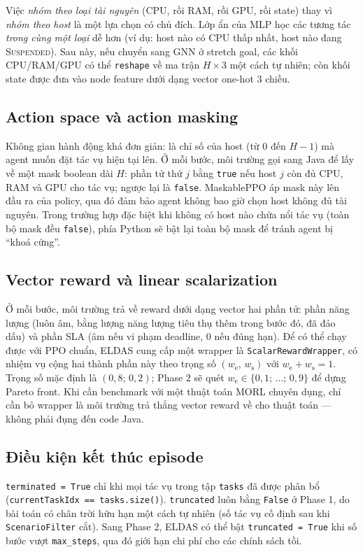 Việc \emph{nhóm theo loại tài nguyên} (CPU, rồi RAM, rồi GPU, rồi
state) thay vì \emph{nhóm theo host} là một lựa chọn có chủ đích.
Lớp ẩn của MLP học các tương tác \emph{trong cùng một loại} dễ hơn
(ví dụ: host nào có CPU thấp nhất, host nào đang \textsc{Suspended}).
Sau này, nếu chuyển sang GNN ở stretch goal, các khối CPU/RAM/GPU có
thể \texttt{reshape} về ma trận $H \times 3$ một cách tự nhiên; còn
khối state được đưa vào node feature dưới dạng vector one-hot $3$
chiều.

\subsection{Action space và action masking}
\label{ssec:action-space}
Không gian hành động khá đơn giản: là chỉ số của host (từ $0$ đến
$H - 1$) mà agent muốn đặt tác vụ hiện tại lên. Ở mỗi bước, môi
trường gọi sang Java để lấy về một mask boolean dài $H$: phần tử thứ
$j$ bằng \texttt{true} nếu host $j$ còn đủ CPU, RAM và GPU cho tác
vụ; ngược lại là \texttt{false}. MaskablePPO áp mask này lên đầu ra
của policy, qua đó đảm bảo agent không bao giờ chọn host không đủ
tài nguyên. Trong trường hợp đặc biệt khi không có host nào chứa nổi
tác vụ (toàn bộ mask đều \texttt{false}), phía Python sẽ bật lại
toàn bộ mask để tránh agent bị ``khoá cứng''.

\subsection{Vector reward và linear scalarization}
\label{ssec:reward}
Ở mỗi bước, môi trường trả về reward dưới dạng vector hai phần tử:
phần năng lượng (luôn âm, bằng lượng năng lượng tiêu thụ thêm trong
bước đó, đã đảo dấu) và phần SLA (âm nếu vi phạm deadline, $0$ nếu
đúng hạn). Để có thể chạy được với PPO chuẩn, ELDAS cung cấp một
wrapper là \texttt{ScalarRewardWrapper}, có nhiệm vụ cộng hai thành
phần này theo trọng số $(w_{\mathrm{e}},\,w_{\mathrm{s}})$ với
$w_{\mathrm{e}} + w_{\mathrm{s}} = 1$. Trọng số mặc định là
$(0{,}8;\,0{,}2)$; Phase 2 sẽ quét $w_{\mathrm{e}} \in \{0{,}1;\,
\dots;\, 0{,}9\}$ để dựng Pareto front. Khi cần benchmark với một
thuật toán MORL chuyên dụng, chỉ cần bỏ wrapper là môi trường trả
thẳng vector reward về cho thuật toán --- không phải đụng đến code
Java.

\subsection{Điều kiện kết thúc episode}
\texttt{terminated\,=\,True} chỉ khi mọi tác vụ trong tập
\texttt{tasks} đã được phân bổ
(\texttt{currentTaskIdx == tasks.size()}). \texttt{truncated} luôn
bằng \texttt{False} ở Phase 1, do bài toán có chân trời hữu hạn một
cách tự nhiên (số tác vụ cố định sau khi \texttt{ScenarioFilter}
cắt). Sang Phase 2, ELDAS có thể bật \texttt{truncated\,=\,True} khi
số bước vượt \texttt{max\_steps}, qua đó giới hạn chi phí cho các
chính sách tồi.

